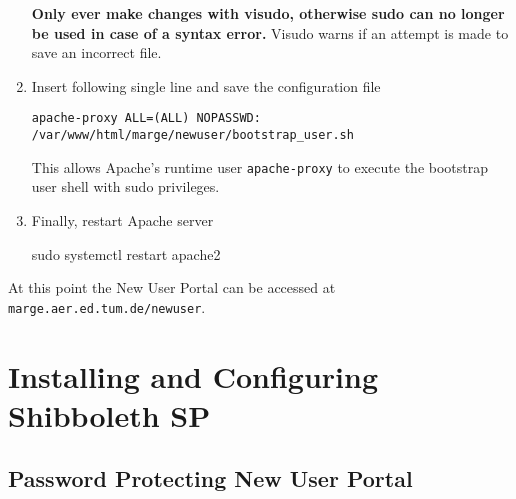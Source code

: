 \begin{enumerate}
\begin{terminal}
    \end{terminal}
    \textbf{Only ever make changes with visudo, otherwise sudo can no longer be
    used in case of a syntax error.} Visudo warns if an attempt is made to save
    an incorrect file.
    \item Insert following single line and save the configuration file
    \begin{lstlisting}[frame={l}]
        apache-proxy ALL=(ALL) NOPASSWD: /var/www/html/marge/newuser/bootstrap_user.sh
    \end{lstlisting}
    This allows Apache's runtime user \texttt{apache-proxy} to execute the
    bootstrap user shell with sudo privileges.
    \item Finally, restart Apache server
    \begin{terminal}
        sudo systemctl restart apache2
    \end{terminal}
\end{enumerate}

At this point the New User Portal can be accessed at
\texttt{marge.aer.ed.tum.de/newuser}.

\section{Installing and Configuring Shibboleth SP}\label{section:shibboleth}

\subsection{Password Protecting New User Portal}
